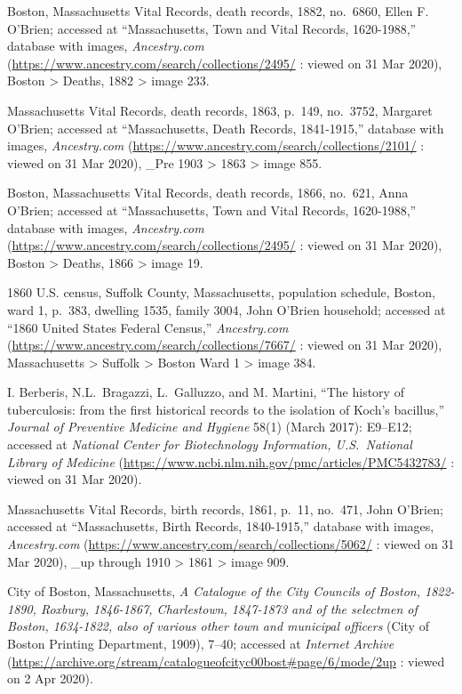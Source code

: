 \begin{thebibliography}{999}
	Boston, Massachusetts Vital Records, death records, 1882, no.\ 6860, Ellen F. O'Brien; accessed at ``Massachusetts, Town and Vital Records, 1620-1988,'' database with images, \textit{Ancestry.com} (\url{https://www.ancestry.com/search/collections/2495/} : viewed on 31 Mar 2020), Boston > Deaths, 1882 > image 233.
	
	Massachusetts Vital Records, death records, 1863, p.\ 149, no.\ 3752, Margaret O'Brien; accessed at ``Massachusetts, Death Records, 1841-1915,'' database with images, \textit{Ancestry.com} (\url{https://www.ancestry.com/search/collections/2101/} : viewed on 31 Mar 2020), \_Pre 1903 > 1863 > image 855.
	
	Boston, Massachusetts Vital Records, death records, 1866, no.\ 621, Anna O'Brien; accessed at ``Massachusetts, Town and Vital Records, 1620-1988,'' database with images, \textit{Ancestry.com} (\url{https://www.ancestry.com/search/collections/2495/} : viewed on 31 Mar 2020), Boston > Deaths, 1866 > image 19.
	
	1860 U.S. census, Suffolk County, Massachusetts, population schedule, Boston, ward 1, p.\ 383, dwelling 1535, family 3004, John O'Brien household; accessed at ``1860 United States Federal Census,'' \textit{Ancestry.com} (\url{https://www.ancestry.com/search/collections/7667/} : viewed on 31 Mar 2020), Massachusetts > Suffolk > Boston Ward 1 > image 384.
	
	I. Berberis, N.L.\ Bragazzi, L.\ Galluzzo, and M. Martini, ``The history of tuberculosis: from the first historical records to the isolation of Koch's bacillus,'' \textit{Journal of Preventive Medicine and Hygiene} 58(1) (March 2017): E9--E12; accessed at \textit{National Center for Biotechnology Information, U.S.\ National Library of Medicine} (\url{https://www.ncbi.nlm.nih.gov/pmc/articles/PMC5432783/} : viewed on 31 Mar 2020).
	
	Massachusetts Vital Records, birth records, 1861, p.\ 11, no.\ 471, John O'Brien; accessed at ``Massachusetts, Birth Records, 1840-1915,'' database with images, \textit{Ancestry.com} (\url{https://www.ancestry.com/search/collections/5062/} : viewed on 31 Mar 2020), \_up through 1910 > 1861 > image 909.
	
	City of Boston, Massachusetts, \textit{A Catalogue of the City Councils of Boston, 1822-1890, Roxbury, 1846-1867, Charlestown, 1847-1873 and of the selectmen of Boston, 1634-1822, also of various other town and municipal officers} (City of Boston Printing Department, 1909), 7--40; accessed at \textit{Internet Archive} (\url{https://archive.org/stream/catalogueofcityc00bost#page/6/mode/2up} : viewed on 2 Apr 2020).
	

\end{thebibliography}
